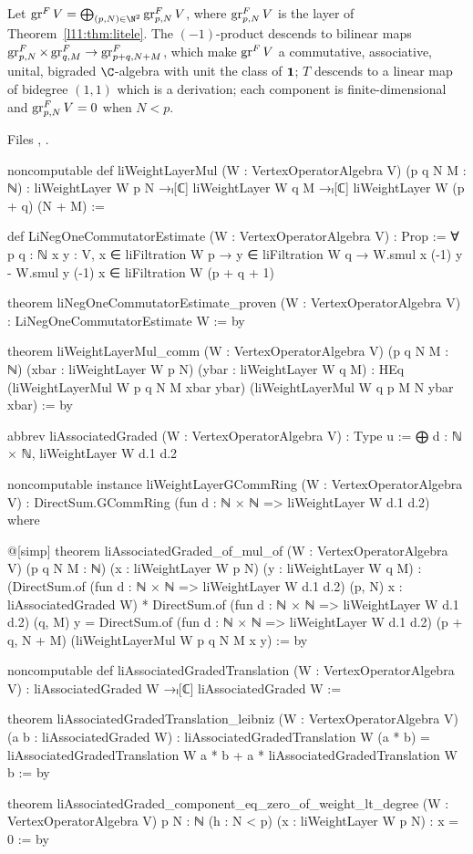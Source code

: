 \begin{theorem}\label{l11:thm:ligr}
Let $\lelevengr^FV = \bigoplus_{(p,N)\in\N^2}\lelevengr^F_{p,N}V$, where $\operatorname{gr}^F_{p,N}V$ is the
layer of Theorem~\ref{l11:thm:litele}. The $(-1)$-product descends to bilinear maps
$\operatorname{gr}^F_{p,N}\times\operatorname{gr}^F_{q,M}\to\operatorname{gr}^F_{p+q,N+M}$, which make $\operatorname{gr}^FV$ a
commutative, associative, unital, bigraded $\C$-algebra with unit the class of $\mathbf{1}$; $T$ descends to
a linear map of bidegree $(1,1)$ which is a derivation; each component is finite-dimensional and
$\operatorname{gr}^F_{p,N}V = 0$ when $N<p$.
\end{theorem}
\noindent Files ,
.
\begin{leancode}
noncomputable def liWeightLayerMul (W : VertexOperatorAlgebra V) (p q N M : ℕ) :
    liWeightLayer W p N →ₗ[ℂ]
      liWeightLayer W q M →ₗ[ℂ] liWeightLayer W (p + q) (N + M) :=

def LiNegOneCommutatorEstimate (W : VertexOperatorAlgebra V) : Prop :=
  ∀ {p q : ℕ} {x y : V}, x ∈ liFiltration W p → y ∈ liFiltration W q →
    W.smul x (-1) y - W.smul y (-1) x ∈ liFiltration W (p + q + 1)

theorem liNegOneCommutatorEstimate_proven (W : VertexOperatorAlgebra V) :
    LiNegOneCommutatorEstimate W := by

theorem liWeightLayerMul_comm (W : VertexOperatorAlgebra V) (p q N M : ℕ)
    (xbar : liWeightLayer W p N) (ybar : liWeightLayer W q M) :
    HEq (liWeightLayerMul W p q N M xbar ybar)
      (liWeightLayerMul W q p M N ybar xbar) := by

abbrev liAssociatedGraded (W : VertexOperatorAlgebra V) : Type u :=
  ⨁ d : ℕ × ℕ, liWeightLayer W d.1 d.2

noncomputable instance liWeightLayerGCommRing (W : VertexOperatorAlgebra V) :
    DirectSum.GCommRing (fun d : ℕ × ℕ => liWeightLayer W d.1 d.2) where

@[simp] theorem liAssociatedGraded_of_mul_of (W : VertexOperatorAlgebra V)
    (p q N M : ℕ) (x : liWeightLayer W p N) (y : liWeightLayer W q M) :
    (DirectSum.of (fun d : ℕ × ℕ => liWeightLayer W d.1 d.2) (p, N) x :
        liAssociatedGraded W) *
      DirectSum.of (fun d : ℕ × ℕ => liWeightLayer W d.1 d.2) (q, M) y =
    DirectSum.of (fun d : ℕ × ℕ => liWeightLayer W d.1 d.2) (p + q, N + M)
      (liWeightLayerMul W p q N M x y) := by

noncomputable def liAssociatedGradedTranslation (W : VertexOperatorAlgebra V) :
    liAssociatedGraded W →ₗ[ℂ] liAssociatedGraded W :=

theorem liAssociatedGradedTranslation_leibniz (W : VertexOperatorAlgebra V)
    (a b : liAssociatedGraded W) :
    liAssociatedGradedTranslation W (a * b) =
      liAssociatedGradedTranslation W a * b + a * liAssociatedGradedTranslation W b := by

theorem liAssociatedGraded_component_eq_zero_of_weight_lt_degree
    (W : VertexOperatorAlgebra V) {p N : ℕ} (h : N < p)
    (x : liWeightLayer W p N) : x = 0 := by
\end{leancode}

